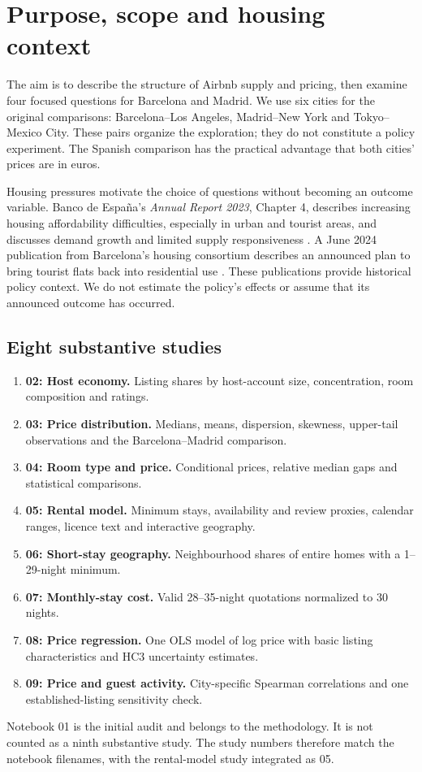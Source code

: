 \documentclass[11pt,a4paper]{article}
\begin{document}
\tableofcontents
\clearpage
\section{Purpose, scope and housing context}
The aim is to describe the structure of Airbnb supply and pricing, then examine four focused questions for Barcelona and Madrid. We use six cities for the original comparisons: Barcelona--Los Angeles, Madrid--New York and Tokyo--Mexico City. These pairs organize the exploration; they do not constitute a policy experiment. The Spanish comparison has the practical advantage that both cities' prices are in euros.

Housing pressures motivate the choice of questions without becoming an outcome variable. Banco de Espa\~na's \emph{Annual Report 2023}, Chapter 4, describes increasing housing affordability difficulties, especially in urban and tourist areas, and discusses demand growth and limited supply responsiveness \cite{bde}. A June 2024 publication from Barcelona's housing consortium describes an announced plan to bring tourist flats back into residential use \cite{housing}. These publications provide historical policy context. We do not estimate the policy's effects or assume that its announced outcome has occurred.

\subsection{Eight substantive studies}
\begin{enumerate}
\item \textbf{02: Host economy.} Listing shares by host-account size, concentration, room composition and ratings.
\item \textbf{03: Price distribution.} Medians, means, dispersion, skewness, upper-tail observations and the Barcelona--Madrid comparison.
\item \textbf{04: Room type and price.} Conditional prices, relative median gaps and statistical comparisons.
\item \textbf{05: Rental model.} Minimum stays, availability and review proxies, calendar ranges, licence text and interactive geography.
\item \textbf{06: Short-stay geography.} Neighbourhood shares of entire homes with a 1--29-night minimum.
\item \textbf{07: Monthly-stay cost.} Valid 28--35-night quotations normalized to 30 nights.
\item \textbf{08: Price regression.} One OLS model of log price with basic listing characteristics and HC3 uncertainty estimates.
\item \textbf{09: Price and guest activity.} City-specific Spearman correlations and one established-listing sensitivity check.
\end{enumerate}
Notebook 01 is the initial audit and belongs to the methodology. It is not counted as a ninth substantive study. The study numbers therefore match the notebook filenames, with the rental-model study integrated as 05.
\end{document}
